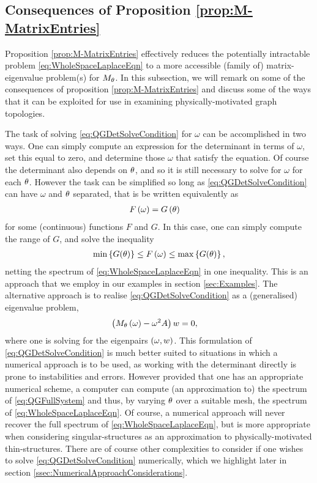 \subsection{Consequences of Proposition \ref{prop:M-MatrixEntries}} \label{ssec:MMatrixConsequences}
Proposition \ref{prop:M-MatrixEntries} effectively reduces the potentially intractable problem \eqref{eq:WholeSpaceLaplaceEqn} to a more accessible (family of) matrix-eigenvalue problem(s) for $M_\theta$.
In this subsection, we will remark on some of the consequences of proposition \ref{prop:M-MatrixEntries} and discuss some of the ways that it can be exploited for use in examining physically-motivated graph topologies. \newline

The task of solving \eqref{eq:QGDetSolveCondition} for $\omega$ can be accomplished in two ways.
One can simply compute an expression for the determinant in terms of $\omega$, set this equal to zero, and determine those $\omega$ that satisfy the equation.
Of course the determinant also depends on $\theta$, and so it is still necessary to solve for $\omega$ for each $\theta$.
However the task can be simplified so long as \eqref{eq:QGDetSolveCondition} can have $\omega$ and $\theta$ separated, that is be written equivalently as
\begin{align*}
	F\left( \omega \right) &= G\left( \theta \right)
\end{align*}
for some (continuous) functions $F$ and $G$.
In this case, one can simply compute the range of $G$, and solve the inequality
\begin{align*}
	\min\left\{ G(\theta) \right\} \leq F\left( \omega \right) \leq \max\left\{ G(\theta) \right\},
\end{align*}
netting the spectrum of \eqref{eq:WholeSpaceLaplaceEqn} in one inequality.
This is an approach that we employ in our examples in section \ref{sec:Examples}.
The alternative approach is to realise \eqref{eq:QGDetSolveCondition} as a (generalised) eigenvalue problem,
\begin{align} \label{eq:QGGenEvalSolve}
	\left(  M_\theta\left( \omega \right)-\omega^2 A  \right)w &= 0,
\end{align}
where one is solving for the eigenpairs $\left( \omega, w \right)$.
This formulation of \eqref{eq:QGDetSolveCondition} is much better suited to situations in which a numerical approach is to be used, as working with the determinant directly is prone to instabilities and errors.
However provided that one has an appropriate numerical scheme,  a computer can compute (an approximation to) the spectrum of \eqref{eq:QGFullSystem} and thus, by varying $\theta$ over a suitable mesh, the spectrum of \eqref{eq:WholeSpaceLaplaceEqn}.
Of course, a numerical approach will never recover the full spectrum of \eqref{eq:WholeSpaceLaplaceEqn}, but is more appropriate when considering singular-structures as an approximation to physically-motivated thin-structures.
There are of course other complexities to consider if one wishes to solve \eqref{eq:QGDetSolveCondition} numerically, which we highlight later in section \ref{ssec:NumericalApproachConsiderations}. \newline

